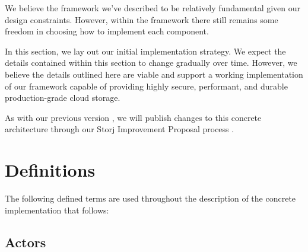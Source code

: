 \documentclass[8pt,fleqn,openany]{book}
\begin{document}
We believe the framework we've described to be relatively fundamental
given our design constraints. However, within the framework there still remains
some freedom in choosing how to implement each component.

In this section, we lay out our initial implementation strategy. We expect
the details contained within this section to change gradually over time.
However, we believe the details outlined here are viable and support a working
implementation of our framework capable of providing highly secure, performant,
and durable production-grade cloud storage.

As with our previous version \cite{storj-v2}, we will publish changes to this
concrete architecture through our Storj Improvement Proposal process \cite{sips}.

\section{Definitions}

The following defined terms are used throughout the description of the concrete
implementation that follows:

\subsection{Actors}
\end{document}
